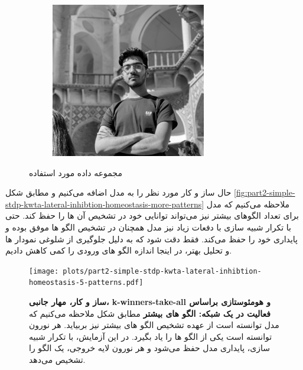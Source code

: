 \begin{figure}[H]
\begin{subfigure}[b]{0.15\textwidth}
                    \caption{}
                    \label{fig:waterloo-camera}
                \end{subfigure}
                \hfill
                \begin{subfigure}[b]{0.15\textwidth}
                    \centering
                    \includegraphics[width=\textwidth]{images/me.jpg}
                    \caption{}
                    \label{fig:extra-image}
                \end{subfigure}
            \caption{مجموعه داده مورد استفاده}
            \label{fig:part2-5-patterns}
        \end{figure}

        حال ساز و کار مورد نظر را به مدل اضافه می‌کنیم و مطابق شکل
        \ref{fig:part2-simple-stdp-kwta-lateral-inhibtion-homeostasis-more-patterns}
        ملاحظه می‌کنیم که مدل برای تعداد الگوهای بیشتر نیز می‌تواند توانایی خود در تشخیص آن ها را حفظ کند. حتی با تکرار شبیه سازی با دفعات زیاد نیز مدل همچنان در تشخیص الگو ها موفق بوده و پایداری خود را حفظ می‌کند. فقط دقت شود که به دلیل جلوگیری از شلوغی نمودار ها و تحلیل بهتر، در اینجا اندازه الگو های ورودی را کمی کاهش دادیم.

        \begin{figure}[!ht]
            \centering
            \texttt{[image: plots/part2-simple-stdp-kwta-lateral-inhibtion-homeostasis-5-patterns.pdf]} 
            \captionsetup{width=.9\linewidth}
            \caption{\textbf{ ساز و کار، مهار جانبی، 
            k-winners-take-all و 
            هومئوستازی براساس فعالیت در یک شبکه: الگو های بیشتر} مطابق شکل ملاحظه می‌کنیم که مدل توانسته است از عهده تشخیص الگو های بیشتر نیز بربیاید. هر نورون توانسته است یکی از الگو ها را یاد بگیرد. در این آزمایش، با تکرار شبیه سازی، پایداری مدل حفظ می‌شود و هر نورون لایه خروجی، یک الگو را تشخیص می‌دهد.}
            \label{fig:part2-simple-stdp-kwta-lateral-inhibtion-homeostasis-5-patterns}
        \end{figure}


